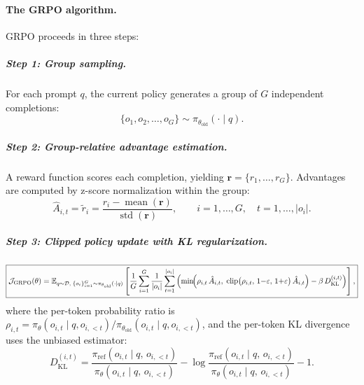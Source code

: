 \documentclass[12pt,a4paper]{report}
\begin{document}
\paragraph{The GRPO algorithm.}
GRPO proceeds in three steps:

\subparagraph{Step 1: Group sampling.}
For each prompt $q$, the current policy generates a group of $G$ independent completions:
\begin{equation}
\label{eq:grpo-sampling}
\{o_1, o_2, \ldots, o_G\} \sim \pi_{\theta_{\text{old}}}(\cdot \mid q).
\end{equation}

\subparagraph{Step 2: Group-relative advantage estimation.}
A reward function scores each completion, yielding $\mathbf{r} = \{r_1, \ldots, r_G\}$. Advantages are computed by z-score normalization within the group:
\begin{equation}
\label{eq:grpo-advantage}
\boxed{
\hat{A}_{i,t} = \tilde{r}_i
  = \frac{r_i - \operatorname{mean}(\mathbf{r})}
         {\operatorname{std}(\mathbf{r})},
\qquad i = 1, \ldots, G,
\quad t = 1, \ldots, |o_i|.}
\end{equation}

\subparagraph{Step 3: Clipped policy update with KL regularization.}
\begin{equation}
\label{eq:grpo-objective}
\boxed{
\mathcal{J}_{\text{GRPO}}(\theta)
  = \mathbb{E}_{q \sim \mathcal{D},\;
      \{o_i\}_{i=1}^{G} \sim \pi_{\theta_{\text{old}}}(\cdot|q)}
    \left[
      \frac{1}{G}\sum_{i=1}^{G}
      \frac{1}{|o_i|}\sum_{t=1}^{|o_i|}
      \left(
        \min\!\Bigl(
          \rho_{i,t}\,\hat{A}_{i,t},\;
          \operatorname{clip}\bigl(\rho_{i,t},\,
            1{-}\varepsilon,\,1{+}\varepsilon\bigr)\,\hat{A}_{i,t}
        \Bigr)
        - \beta\, D_{\mathrm{KL}}^{(i,t)}
      \right)
    \right],}
\end{equation}
where the per-token probability ratio is $\rho_{i,t} = \pi_\theta(o_{i,t} \mid q, o_{i,<t}) / \pi_{\theta_{\text{old}}}(o_{i,t} \mid q, o_{i,<t})$, and the per-token KL divergence uses the unbiased estimator:
\begin{equation}
\label{eq:grpo-kl}
D_{\mathrm{KL}}^{(i,t)}
  = \frac{\pi_{\text{ref}}(o_{i,t} \mid q,\, o_{i,<t})}
         {\pi_\theta(o_{i,t} \mid q,\, o_{i,<t})}
  - \log\frac{\pi_{\text{ref}}(o_{i,t} \mid q,\, o_{i,<t})}
             {\pi_\theta(o_{i,t} \mid q,\, o_{i,<t})}
  - 1.
\end{equation}
\end{document}
